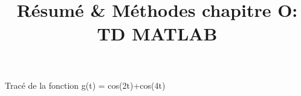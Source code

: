 \documentclass[11pt,a4paper]{article}
\begin{document}
\title{Résumé \& Méthodes chapitre O: TD MATLAB}
Tracé de la fonction g(t) = cos(2t)+cos(4t) 


\maketitle
\end{document}
